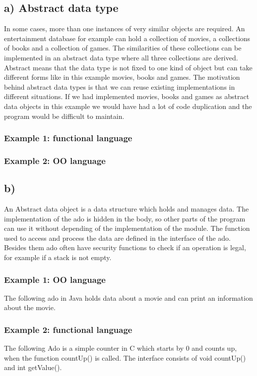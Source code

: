\documentclass[a4paper,10pt]{scrartcl}[2003/01/01]
\begin{document}
	\subsection*{a) Abstract data type}
	In some cases, more than one instances of very similar objects are required. An  entertainment database for example can hold a collection of movies, a collections of books and a collection of games. The similarities of these collections can be implemented in an abstract data type where all three collections are derived. Abstract means that the data type is not fixed to one kind of object but can take different forms like in this example movies, books and games. The motivation behind abstract data types is that we can reuse existing implementations in different situations. If we had implemented movies, books and games as abstract data objects in this example we would have had a lot of code duplication and the program would be difficult to maintain.
	
	\subsubsection*{Example 1: functional language}
	
	
	\subsubsection*{Example 2: OO language}
	
	
	
	\subsection*{b)}
	An Abstract data object is a data structure which holds and manages data. The implementation of the ado is hidden in the body, so other parts of the program can use it without depending of the implementation of the module. The function used to access and process the data are defined in the interface of the ado. Besides them ado often have security functions to check if an operation is legal, for example if a stack is not empty. 
	
	\subsubsection*{Example 1: OO language}
	The following ado in Java holds data about a movie and can print an information about the movie. 
	
	
	\subsubsection*{Example 2: functional language}
	The following Ado is a simple counter in C which starts by 0 and counts up, when the function countUp() is called. The interface consists of void countUp() and int getValue().
	
	
\end{document}
